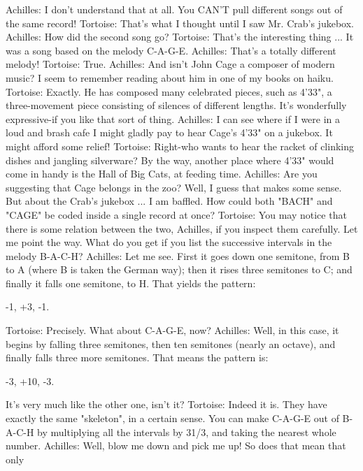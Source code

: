 Achilles: I don't understand that at all. You CAN'T pull different songs out of the same record!
Tortoise: That's what I thought until I saw Mr. Crab's jukebox. Achilles: How did the second
       song go?
Tortoise: That's the interesting thing ... It was a song based on the melody C-A-G-E.
Achilles: That's a totally different melody!
Tortoise: True.
Achilles: And isn't John Cage a composer of modern music? I seem to remember reading about
       him in one of my books on haiku.
Tortoise: Exactly. He has composed many celebrated pieces, such as 4'33", a three-movement
       piece consisting of silences of different lengths. It's wonderfully expressive-if you like
       that sort of thing.
Achilles: I can see where if I were in a loud and brash cafe I might gladly pay to hear Cage's
       4'33" on a jukebox. It might afford some relief!
Tortoise: Right-who wants to hear the racket of clinking dishes and jangling silverware? By the
       way, another place where 4'33" would come in handy is the Hall of Big Cats, at feeding
       time.
Achilles: Are you suggesting that Cage belongs in the zoo? Well, I guess that makes some sense.
       But about the Crab's jukebox ... I am baffled. How could both "BACH" and "CAGE" be
       coded inside a single record at once?
Tortoise: You may notice that there is some relation between the two, Achilles, if you inspect
       them carefully. Let me point the way. What do you get if you list the successive intervals
       in the melody B-A-C-H?
Achilles: Let me see. First it goes down one semitone, from B to A (where B is taken the
       German way); then it rises three semitones to C; and finally it falls one semitone, to H.
       That yields the pattern:

                                           -1, +3, -1.

Tortoise: Precisely. What about C-A-G-E, now?
Achilles: Well, in this case, it begins by falling three semitones, then ten semitones (nearly an
       octave), and finally falls three more semitones. That means the pattern is:

                                          -3, +10, -3.

       It's very much like the other one, isn't it?
Tortoise: Indeed it is. They have exactly the same "skeleton", in a certain sense. You can make
       C-A-G-E out of B-A-C-H by multiplying all the intervals by 31/3, and taking the nearest
       whole number.
Achilles: Well, blow me down and pick me up! So does that mean that only

